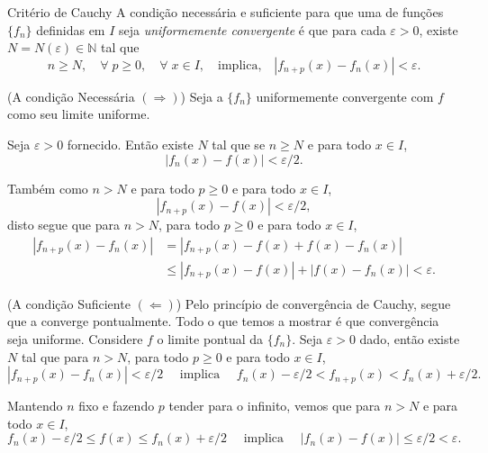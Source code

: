 \begin{theoc}{Critério de Cauchy}{}
A condição necessária e suficiente para
que uma \seq de funções $\{f_n\}$ definidas em $I$ seja
\textit{uniformemente convergente} é que para cada
$\varepsilon>0$, existe $N=N(\varepsilon)\in \mathbb{N}$ tal que
\begin{equation*}
n \geq N,\quad \forall\; p\ge 0,\quad \forall\; x\in I,\quad \text{implica,}
\quad   |f_{n+p}(x)-f_n(x)|<\varepsilon.
\end{equation*}
\end{theoc}

\prova (A condição Necessária \((\Rightarrow)\)) Seja a \seq $\{f_n\}$
uniformemente convergente com $f$ como seu limite uniforme.

Seja $\varepsilon>0$ fornecido. Então existe $N$ tal que se $n\ge
N$ e para todo $x\in I$,
\begin{equation*}
    |f_n(x)-f(x)|<\varepsilon/2.
\end{equation*}

Também como $n> N$ e para todo $p\ge 0$ e para todo $x\in I$,
\begin{equation*}
    |f_{n+p}(x)-f(x)|<\varepsilon/2,
\end{equation*}
disto segue que para $n> N$, para todo $p\ge 0$ e para todo $x\in
I$,
\begin{align*}
|f_{n+p}(x)-f_n(x)|&=|f_{n+p}(x)-f(x)+f(x)-f_n(x)|\\[2ex]
&\le |f_{n+p}(x)-f(x)|+|f(x)-f_n(x)|<\varepsilon.
\end{align*}

(A condição Suficiente \((\Leftarrow )\))
Pelo princípio de
convergência de Cauchy, segue que a \seq converge pontualmente.
Todo o que temos a mostrar é que convergência seja uniforme.
Considere $f$ o limite pontual da \seq $\{f_n\}$. Seja
$\varepsilon>0$ dado, então existe $N$ tal que para $n> N$, para
todo $p\ge 0$ e para todo $x\in I$,
\begin{equation*}
|f_{n+p}(x)-f_n(x)|< \varepsilon/2\quad\textrm{ implica }\quad
f_n(x)-\varepsilon/2<f_{n+p}(x)<f_n(x)+\varepsilon/2.
\end{equation*}

Mantendo $n$ fixo e fazendo $p$ tender para o infinito, vemos que
para $n> N$ e para todo $x\in I$,
\begin{equation*}
    f_n(x)-\varepsilon/2\le f(x)\le f_n(x)+\varepsilon/2\quad
    \textrm{ implica }\quad
 |f_n(x)-f(x)|\le\varepsilon/2<\varepsilon.
\end{equation*}

